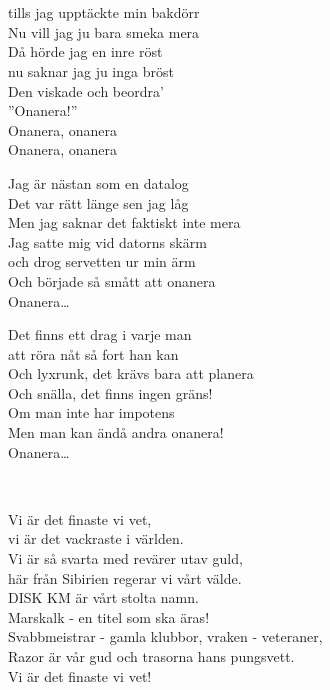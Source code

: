 \newpage

 \\       
\author{Text: Sober}

\\
tills jag upptäckte min bakdörr\\
Nu vill jag ju bara smeka mera\\
Då hörde jag en inre röst\\
nu saknar jag ju inga bröst\\
Den viskade och beordra’ \\
”Onanera!” \\
Onanera, onanera\\
Onanera, onanera

Jag är nästan som en datalog\\
Det var rätt länge sen jag låg\\
Men jag saknar det faktiskt inte mera\\
Jag satte mig vid datorns skärm\\
och drog servetten ur min ärm\\
Och började så smått att onanera\\
Onanera…

Det finns ett drag i varje man\\
att röra nåt så fort han kan\\
Och lyxrunk, det krävs bara att planera\\
Och snälla, det finns ingen gräns!\\
Om man inte har impotens\\
Men man kan ändå andra onanera!\\
Onanera…



 \\       
\author{Text: Ida Wellner}

\songtext{}Vi är det finaste vi vet,\\
vi är det vackraste i världen.\\
Vi är så svarta med revärer utav guld,\\
här från Sibirien regerar vi vårt välde.\\
DISK KM är vårt stolta namn.\\
Marskalk - en titel som ska äras!\\
Svabbmeistrar - gamla klubbor, vraken - veteraner,\\
Razor är vår gud och trasorna hans pungsvett.\\
Vi är det finaste vi vet!

